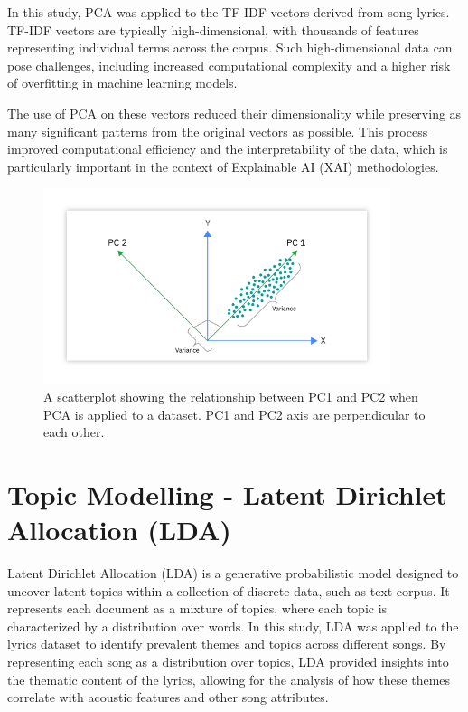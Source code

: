 In this study, PCA was applied to the TF-IDF vectors derived from song lyrics.
TF-IDF vectors are typically high-dimensional, with thousands of features
representing individual terms across the corpus. Such high-dimensional data can
pose challenges, including increased computational complexity and a higher risk
of overfitting in machine learning models.

The use of PCA on these vectors reduced their dimensionality while preserving
as many significant patterns from the original vectors as possible. This
process improved computational efficiency and the interpretability of the data,
which is particularly important in the context of Explainable AI (XAI)
methodologies.

\begin{center}
\begin{figure}[ht]
  \centering
  \includegraphics[width=4in]{img/pca.png}
  \caption{A scatterplot showing the relationship between PC1 and PC2 when PCA
  is applied to a dataset. PC1 and PC2 axis are perpendicular to each other.\cite{pca}}
  \label{Figure:fig_beh}
\end{figure}
\end{center}


\section{Topic Modelling - Latent Dirichlet Allocation (LDA)}
\label{sec:topicmodelling}

Latent Dirichlet Allocation (LDA)\cite{lda} is a generative probabilistic model
designed to uncover latent topics within a collection of discrete data, such as
text corpus.  It represents each document as a mixture of topics, where each
topic is characterized by a distribution over words. In this study, LDA was
applied to the lyrics dataset to identify prevalent themes and topics across
different songs. By representing each song as a distribution over topics, LDA
provided insights into the thematic content of the lyrics, allowing for the
analysis of how these themes correlate with acoustic features and other song
attributes.

